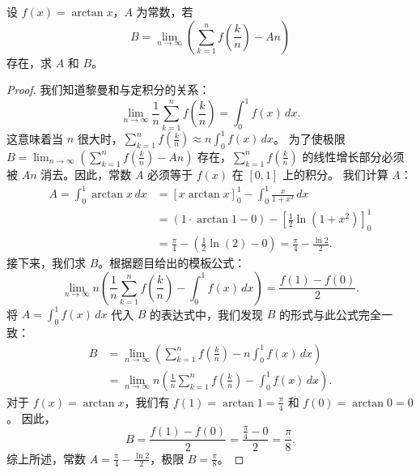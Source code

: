 \documentclass[lang=cn,10pt,thmcnt=section]{elegantbook}
\begin{document}
\begin{example}
    设 \( f(x) = \arctan x \)，\( A \) 为常数，若
    \[
    B = \lim_{n \to \infty} \left( \sum_{k=1}^n f\left(\frac{k}{n}\right) - A n \right)
    \]
    存在，求 \( A \) 和 \( B \)。
\end{example}
\begin{proof}
    我们知道黎曼和与定积分的关系：
    \[
    \lim_{n \to \infty} \frac{1}{n} \sum_{k=1}^n f\left(\frac{k}{n}\right) = \int_0^1 f(x) \, dx.
    \]
    这意味着当 $n$ 很大时，$\sum_{k=1}^n f(\frac{k}{n}) \approx n \int_0^1 f(x) \, dx$。
    为了使极限 $B = \lim_{n \to \infty} ( \sum_{k=1}^n f(\frac{k}{n}) - A n )$ 存在，$\sum_{k=1}^n f(\frac{k}{n})$ 的线性增长部分必须被 $An$ 消去。因此，常数 $A$ 必须等于 $f(x)$ 在 $[0,1]$ 上的积分。
    我们计算 $A$：
    \begin{align*}
        A = \int_0^1 \arctan x \, dx &= \left[ x \arctan x \right]_0^1 - \int_0^1 \frac{x}{1+x^2} \, dx \\
        &= (1 \cdot \arctan 1 - 0) - \left[ \frac{1}{2} \ln(1+x^2) \right]_0^1 \\
        &= \frac{\pi}{4} - \left( \frac{1}{2}\ln(2) - 0 \right) = \frac{\pi}{4} - \frac{\ln 2}{2}.
    \end{align*}
    接下来，我们求 $B$。根据题目给出的模板公式：
    \[
    \lim_{n \to \infty} n \left( \frac{1}{n} \sum_{k=1}^n f\left(\frac{k}{n}\right) - \int_0^1 f(x) \, dx \right) = \frac{f(1) - f(0)}{2}.
    \]
    将 $A = \int_0^1 f(x) \, dx$ 代入 $B$ 的表达式中，我们发现 $B$ 的形式与此公式完全一致：
    \begin{align*}
        B &= \lim_{n \to \infty} \left( \sum_{k=1}^n f\left(\frac{k}{n}\right) - n \int_0^1 f(x) \, dx \right) \\
        &= \lim_{n \to \infty} n \left( \frac{1}{n} \sum_{k=1}^n f\left(\frac{k}{n}\right) - \int_0^1 f(x) \, dx \right).
    \end{align*}
    对于 $f(x) = \arctan x$，我们有 $f(1) = \arctan 1 = \frac{\pi}{4}$ 和 $f(0) = \arctan 0 = 0$。
    因此，
    \[
    B = \frac{f(1) - f(0)}{2} = \frac{\frac{\pi}{4} - 0}{2} = \frac{\pi}{8}.
    \]
    综上所述，常数 $A = \frac{\pi}{4} - \frac{\ln 2}{2}$，极限 $B = \frac{\pi}{8}$。
\end{proof}
\end{document}
